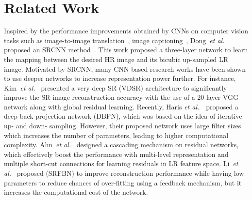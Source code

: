 \documentclass[a4paper,11pt]{article}
\begin{document}
%
 \section{Related Work}
\label{related-work}








Inspired by the performance improvements obtained by CNNs on computer vision tasks such as image-to-image translation~\cite{rana}, image captioning~\cite{Ghosal_2019_ICCV}, Dong~\textit{et al.} proposed an SRCNN method~\cite{SRCNN}. This work proposed a three-layer network to learn the mapping between the desired HR image and its bicubic up-sampled LR image. Motivated by SRCNN, many CNN-based research works have been shown to use deeper networks to increase representation power further. For instance, Kim~\textit{et al.}~\cite{VDSR} presented a very deep SR (VDSR) architecture to significantly improve the SR image reconstruction accuracy with the use of a 20 layer VGG network \cite{VGG} along with global residual learning. Recently, Haris \textit{et al.}~\cite{DBPN}~proposed a deep back-projection network (DBPN), which was based on the idea of iterative up- and down- sampling. 
However, their proposed network uses large filter sizes which increases the number of parameters, leading to higher computational complexity. Ahn~\textit{et al.}~\cite{CARN} designed a cascading mechanism on residual networks, which effectively boost the performance with multi-level representation and multiple short-cut connections for learning residuals in LR feature space.  Li~\textit{et al.}~\cite{SRFBN} proposed (SRFBN) to improve reconstruction performance while having low parameters to reduce chances of over-fitting using a feedback mechanism, but it increases the computational cost of the network.
\end{document}

